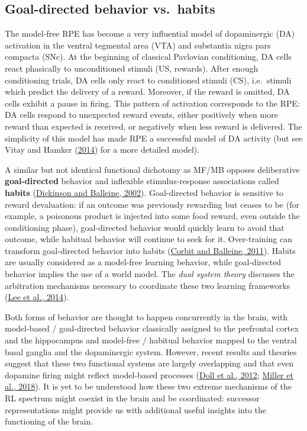 \documentclass[
  11pt,
]{article}
\begin{document}
\hypertarget{goal-directed-behavior-vs.-habits}{%
\subsection{Goal-directed behavior
vs.~habits}\label{goal-directed-behavior-vs.-habits}}

The model-free RPE has become a very influential model of dopaminergic
(DA) activation in the ventral tegmental area (VTA) and substantia nigra
pars compacta (SNc). At the beginning of classical Pavlovian
conditioning, DA cells react phasically to unconditioned stimuli (US,
rewards). After enough conditioning trials, DA cells only react to
conditioned stimuli (CS), i.e.~stimuli which predict the delivery of a
reward. Moreover, if the reward is omitted, DA cells exhibit a pause in
firing. This pattern of activation corresponds to the RPE: DA cells
respond to unexpected reward events, either positively when more reward
than expected is received, or negatively when less reward is delivered.
The simplicity of this model has made RPE a successful model of DA
activity (but see Vitay and Hamker
(\protect\hyperlink{ref-Vitay2014}{2014}) for a more detailed model).

A similar but not identical functional dichotomy as MF/MB opposes
deliberative \textbf{goal-directed} behavior and inflexible
stimulus-response associations called \textbf{habits}
(\protect\hyperlink{ref-Dickinson2002}{Dickinson and Balleine, 2002}).
Goal-directed behavior is sensitive to reward devaluation: if an outcome
was previously rewarding but ceases to be (for example, a poisonous
product is injected into some food reward, even outside the conditioning
phase), goal-directed behavior would quickly learn to avoid that
outcome, while habitual behavior will continue to seek for it.
Over-training can transform goal-directed behavior into habits
(\protect\hyperlink{ref-Corbit2011}{Corbit and Balleine, 2011}). Habits
are usually considered as a model-free learning behavior, while
goal-directed behavior implies the use of a world model. The \emph{dual
system theory} discusses the arbitration mechanisms necessary to
coordinate these two learning frameworks
(\protect\hyperlink{ref-Lee2014}{Lee et al., 2014}).

Both forms of behavior are thought to happen concurrently in the brain,
with model-based / goal-directed behavior classically assigned to the
prefrontal cortex and the hippocampus and model-free / habitual behavior
mapped to the ventral basal ganglia and the dopaminergic system.
However, recent results and theories suggest that these two functional
systems are largely overlapping and that even dopamine firing might
reflect model-based processes (\protect\hyperlink{ref-Doll2012}{Doll et
al., 2012}; \protect\hyperlink{ref-Miller2018}{Miller et al., 2018}). It
is yet to be understood how these two extreme mechanisms of the RL
spectrum might coexist in the brain and be coordinated: successor
representations might provide us with additional useful insights into
the functioning of the brain.
\end{document}
